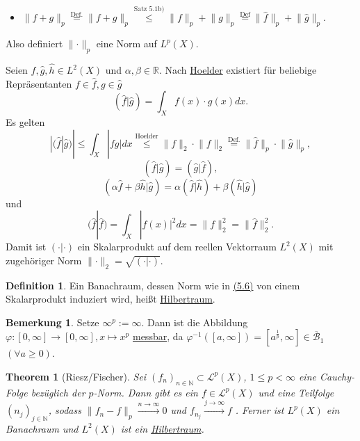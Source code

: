 \documentclass[a4paper]{scrreprt}
\newcommand{\R}{\mathbb{R}}
\newcommand{\N}{\mathbb{N}}
\newcommand{\Borel}{\mathcal{B}}
\newcommand{\Leb}{\mathcal{L}}
\newcommand{\jlabel}[1]{\label{j_#1}}
\newcommand{\jterm}[1]{\jlabel{#1}\uline{#1}}
\newcommand{\jshortlink}[1]{\jhyperref{#1}{\text{#1}}}
\newcommand{\jhyperref}[2]{\hyperref[j_#1]{#2}}
\newcommand{\jlink}[1]{\jhyperref{#1}{#1}}
\newcommand{\fu}{\text{\textit{(f.ü.)}}}
\newcommand{\jabb}[3]{ #1: #2 \rightarrow #3 }
\newcommand{\jspace}{\vspace{8pt}}
\newcommand{\jspacesmall}{\vspace{4pt}}
\theoremstyle{plain}
\newtheorem{thm}{Theorem}[chapter]
\theoremstyle{definition}
\newtheorem*{defn*}{Definition}
\newtheorem*{bem*}{Bemerkung}
\begin{document}
{{{{\begin{itemize}
    \item $\lVert f + g \rVert_p \overset{\text{Def.}}{=} \lVert f+g \rVert_p \overset{\jshortlink{Satz 5.1b)}}{\le} \lVert f \rVert_p + \lVert g \rVert_p \overset{\text{Def}}{=} \lVert \hat{f} \rVert_p + \lVert \hat{g} \rVert_p$.
\end{itemize}
Also definiert $\lVert \cdot \rVert_p$ eine Norm auf $L^p(X)$.

\jspace

Seien $\hat{f},\hat{g},\hat{h} \in L^2(X)$ und $\alpha,\beta \in \R$. Nach \jlink{Hoelder} existiert für beliebige Repräsentanten $f\in\hat{f},g\in\hat{g}$
\begin{equation}
    \jlabel{(5.3)}
    (\hat{f}|\hat{g}) = \int_X f(x)\cdot g(x) dx.
\end{equation}
Es gelten
\begin{equation}
    \jlabel{(5.4)}
    |(\hat{f}|\hat{g})| \le \int_X |fg| dx \overset{\jshortlink{Hoelder}}{\le} \lVert f \rVert_2 \cdot \lVert f \rVert_2 \overset{\text{Def.}}{=} \lVert \hat{f} \rVert_p \cdot \lVert \hat{g} \rVert_p,
\end{equation}
\[
    (\hat{f}|\hat{g}) = (\hat{g}|\hat{f}),
\]
\begin{equation}
    \jlabel{(5.5)}
    (\alpha \hat{f} + \beta \hat{h} | \hat{g}) = \alpha (\hat{f}|\hat{h}) + \beta (\hat{h}|\hat{g})
\end{equation}
und
\begin{equation}
    \jlabel{(5.6)}
    (\hat{f}|\hat{f}) = \int_X |f(x)|^2 dx = \lVert f \rVert_2^2 = \lVert \hat{f} \rVert_2^2.
\end{equation}
Damit ist $(\cdot|\cdot)$ ein Skalarprodukt auf dem reellen Vektorraum $L^2(X)$ mit zugehöriger Norm $\lVert \cdot \rVert_2 = \sqrt{(\cdot | \cdot)}$.

\begin{defn*}
    Ein Banachraum, dessen Norm wie in \jlink{(5.6)} von einem Skalarprodukt induziert wird, heißt \jterm{Hilbertraum}.
\end{defn*}

\begin{bem*}
    Setze $\infty^p := \infty$. Dann ist die Abbildung $\jabb{\varphi}{[0,\infty]}{[0,\infty]}, x\mapsto x^p$ \jlink{messbar}, da $\varphi
    ^{-1}([a,\infty]) = [a^\frac{1}{p},\infty]\in \overline{\Borel}_1$ $(\forall a \ge 0)$.
\end{bem*}

\begin{thm}[Riesz/Fischer]
    \jlabel{Thm 5.6}
    Sei $(f_n)_{n\in\N}\subset \Leb^p(X)$, $1\le p < \infty$ eine Cauchy-Folge bezüglich der $p$-Norm. Dann gibt es ein $f\in\Leb^p(X)$ und eine Teilfolge $(n_j)_{j\in\N}$, sodass $\lVert f_n - f\rVert_p \xrightarrow{n\to \infty} 0$ und $f_{n_j} \xrightarrow{j\to \infty} f$ \fu.
    \jspacesmall
    Ferner ist $L^p(X)$ ein Banachraum und $L^2(X)$ ist ein \jlink{Hilbertraum}.
    

\end{thm}}}}}
\end{document}
